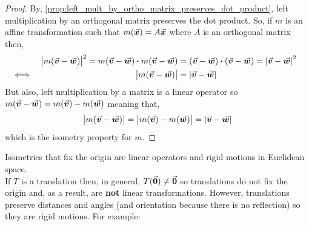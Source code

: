 \documentclass[MathsNotesBase.tex]{subfiles}
\begin{document}
{	\medskip
	\begin{proof}
		By, \autoref{prop:left_mult_by_ortho_matrix_preserves_dot_product}, left multiplication by an orthogonal matrix preserves the dot product. So, if $m$ is an affine transformation such that ${ m(\vec{\bm{x}}) = A\vec{\bm{x}}  }$ where $A$ is an orthogonal matrix then,
		\begin{align*}
		&& \left\lvert m(\vec{\bm{v}} - \vec{\bm{w}})\right\rvert^2 = m(\vec{\bm{v}} - \vec{\bm{w}})\boldsymbol{\cdot} m(\vec{\bm{v}} - \vec{\bm{w}}) &= (\vec{\bm{v}} - \vec{\bm{w}})\boldsymbol{\cdot} (\vec{\bm{v}} - \vec{\bm{w}}) = \left\lvert\vec{\bm{v}} - \vec{\bm{w}}\right\rvert^2 \\
		&\iff & \left\lvert m(\vec{\bm{v}} - \vec{\bm{w}})\right\rvert &= \left\lvert\vec{\bm{v}} - \vec{\bm{w}}\right\rvert &\text{\scriptsize{}} \\
		\end{align*}
		But also, left multiplication by a matrix is a linear operator so ${ m(\vec{\bm{v}} - \vec{\bm{w}}) = m(\vec{\bm{v}}) - m(\vec{\bm{w}}) }$ meaning that,
		\[ \left\lvert m(\vec{\bm{v}} - \vec{\bm{w}})\right\rvert = \left\lvert m(\vec{\bm{v}}) - m(\vec{\bm{w}})\right\rvert = \left\lvert\vec{\bm{v}} - \vec{\bm{w}}\right\rvert \]
		which is the isometry property for $m$.
	\end{proof}
	
	
	\bigskip\bigskip
	Isometries that fix the origin are linear operators and rigid motions in Euclidean space.\\
		
	
	\bigskip
	If $T$ is a translation then, in general, ${ T(\vec{\bm{0}}) \neq \vec{\bm{0}} }$ so translations do not fix the origin and, as a result, are \textbf{not} linear transformations. However, translations preserve distances and angles (and orientation because there is no reflection) so they are rigid motions. For example:
	\begin{exe}
	\end{exe}

}
\end{document}
